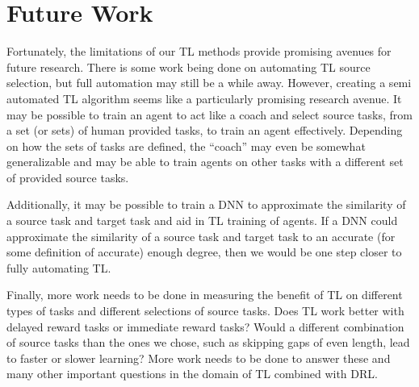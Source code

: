 \documentclass{llncs}
\begin{document}
\section{Future Work}

Fortunately, the limitations of our TL methods provide promising avenues for future research. 
There is some work being done on automating TL source selection, but full automation may still be a while away. 
However, creating a semi automated TL algorithm seems like a particularly promising research avenue. 
It may be possible to train an agent to act like a coach and select source tasks, from a set (or sets) of human provided tasks, to train an agent effectively. 
Depending on how the sets of tasks are defined, the ``coach'' may even be somewhat generalizable and may be able to train agents on other tasks with a different set of provided source tasks. 

Additionally, it may be possible to train a DNN to approximate the similarity of a source task and target task and aid in TL training of agents. 
If a DNN could approximate the similarity of a source task and target task to an accurate (for some definition of accurate) enough degree, then we would be one step closer to fully automating TL.

Finally, more work needs to be done in measuring the benefit of TL on different types of tasks and different selections of source tasks.
Does TL work better with delayed reward tasks or immediate reward tasks?
Would a different combination of source tasks than the ones we chose, such as skipping gaps of even length, lead to faster or slower learning?
More work needs to be done to answer these and many other important questions in the domain of TL combined with DRL. 


%
%
\newpage{}



\end{document}
